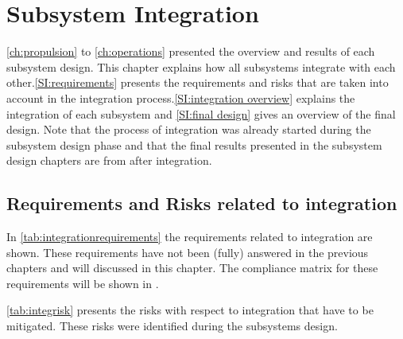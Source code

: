 \chapter{Subsystem Integration}
\label{ch:finaldesign}


\autoref{ch:propulsion} to \autoref{ch:operations} presented the overview and results of each subsystem design. This chapter explains how all subsystems integrate with each other.\autoref{SI:requirements} presents the requirements and risks that are taken into account in the integration process.\autoref{SI:integration overview} explains the integration of each subsystem and \autoref{SI:final design} gives an overview of the final design. Note that the process of integration was already started during the subsystem design phase and that the final results presented in the subsystem design chapters are from after integration.  

\section{Requirements and Risks related to integration} 
\label{SI:requirements}

In \autoref{tab:integrationrequirements} the requirements related to integration are shown. These requirements have not been (fully) answered in the previous chapters and will discussed in this chapter. The compliance matrix for these requirements will be shown in .

\autoref{tab:integrisk} presents the risks with respect to integration that have to be mitigated. These risks were identified during the subsystems design.


